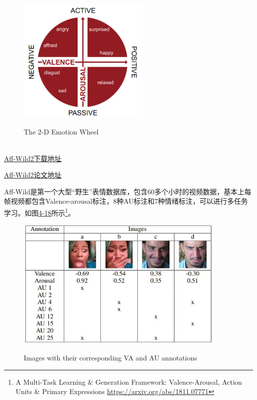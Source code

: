 \begin{figure}
  \centering
  \includegraphics[width=2.5in]{figure/example/Aff-Wild3.png}\\
  \caption{The 2-D Emotion Wheel}
  \label{fig:4-17}
\end{figure}

\quad \\

\href{https://ibug.doc.ic.ac.uk/resources/aff-wild2/}{Aff-Wild2下载地址}

\href{https://www.sci-hub.ren/10.1109/CVPRW.2017.248}{Aff-Wild2论文地址}

Aff-Wild是第一个大型“野生”表情数据库，包含60多个小时的视频数据，基本上每帧视频都包含Valence-arousal标注，8种AU标注和7种情绪标注，可以进行多任务学习。如图\href{fig:4-18}{4-18}所示\footnote{A Multi-Task Learning & Generation Framework: Valence-Arousal,
Action Units & Primary Expressions \quad \url{https://arxiv.org/abs/1811.07771}}。

\begin{figure}
  \centering
  \includegraphics[width=4in]{figure/example/Aff-Wild1.jpg}\\
  \caption{Images with their corresponding VA and AU annotations}
  \label{fig:4-18}
\end{figure}

